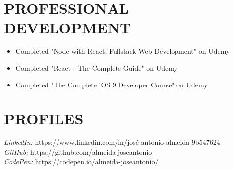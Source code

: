 \documentclass[margin, 10pt]{res} %
\begin{document}
\begin{resume}



\section{PROFESSIONAL \\ DEVELOPMENT} 

\begin{itemize}
\item Completed "Node with React: Fullstack Web Development" on Udemy
\end{itemize}

\begin{itemize}
\item Completed "React - The Complete Guide" on Udemy
\end{itemize}

\begin{itemize}
\item Completed "The Complete iOS 9 Developer Course" on Udemy
\end{itemize}


\section{PROFILES}

{\sl LinkedIn:} https://www.linkedin.com/in/josé-antonio-almeida-9b547624 \\
{\sl GitHub:} https://github.com/almeida-joseantonio \\
{\sl CodePen:} https://codepen.io/almeida-joseantonio/



\end{resume}
\end{document}
